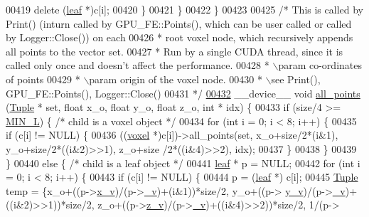 \begin{DoxyCode}
{00419                     \textcolor{keyword}{delete} (\hyperlink{classleaf}{leaf} *)c[i];
00420             \}
00421         \}
00422     \}
00423 
00425     \textcolor{comment}{/*  This is called by Print() (inturn called by GPU\_FE::Points(), which can be user called or called by
       Logger::Close()) on each}
00426 \textcolor{comment}{    *   root voxel node, which recursively appends all points to the vector set.}
00427 \textcolor{comment}{    *   Run by a single CUDA thread, since it is called only once and doesn't affect the performance.}
00428 \textcolor{comment}{    *   \(\backslash\)param co-ordinates of points}
00429 \textcolor{comment}{    *   \(\backslash\)param origin of the voxel node.}
00430 \textcolor{comment}{    *   \(\backslash\)see Print(), GPU\_FE::Points(), Logger::Close()}
00431 \textcolor{comment}{    */}
\hypertarget{Voxel_8cuh_source.tex_l00432}{}\hyperlink{classvoxel_a4189fb0f24ad9eba1447e2ebf8ee0015}{00432}     \_\_device\_\_ \textcolor{keywordtype}{void} \hyperlink{classvoxel_a4189fb0f24ad9eba1447e2ebf8ee0015}{all\_points} (\hyperlink{structTuple}{Tuple} * \textcolor{keyword}{set}, \textcolor{keywordtype}{float} x\_o, \textcolor{keywordtype}{float} y\_o, \textcolor{keywordtype}{float} z\_o, \textcolor{keywordtype}{int} * idx) \{
00433         \textcolor{keywordflow}{if} (size/4 >= \hyperlink{Voxel_8cuh_a29d8f4bb35f9fa62e1d680bc6ab1f4f1}{MIN\_L}) \{ \textcolor{comment}{/* child is a voxel object */}
00434             \textcolor{keywordflow}{for} (\textcolor{keywordtype}{int} i = 0; i < 8; i++) \{
00435                 \textcolor{keywordflow}{if} (c[i] != NULL) \{
00436                     ((\hyperlink{classvoxel}{voxel} *)c[i])->all\_points(\textcolor{keyword}{set}, x\_o+size/2*(i&1), y\_o+size/2*((i&2)>>1), z\_o+size
      /2*((i&4)>>2), idx);
00437                 \}
00438             \}
00439         \}
00440         \textcolor{keywordflow}{else} \{ \textcolor{comment}{/* child is a leaf object */}
00441             \hyperlink{classleaf}{leaf} * p = NULL;
00442             \textcolor{keywordflow}{for} (\textcolor{keywordtype}{int} i = 0; i < 8; i++) \{
00443                 \textcolor{keywordflow}{if} (c[i] != NULL) \{
00444                     p = (\hyperlink{classleaf}{leaf} *) c[i];
00445                     \hyperlink{structTuple}{Tuple} temp = \{x\_o+((p->\hyperlink{classleaf_ac34a93ca5739928d7389b12e735252d4}{x\_v})/(p->\hyperlink{classleaf_a4fc347dbd4f5911bbb477910588ed512}{\_v})+(i&1))*size/2, y\_o+((p->
      \hyperlink{classleaf_a06a94d40da44b846913db4d8900b2626}{y\_v})/(p->\hyperlink{classleaf_a4fc347dbd4f5911bbb477910588ed512}{\_v})+((i&2)>>1))*size/2, z\_o+((p->\hyperlink{classleaf_a5f51fe13eb6e53bd9549469011e7a10e}{z\_v})/(p->\hyperlink{classleaf_a4fc347dbd4f5911bbb477910588ed512}{\_v})+((i&4)>>2))*size/2, 1/(p->
}
\end{DoxyCode}
